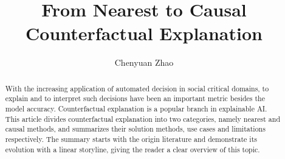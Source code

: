 \documentclass[runningheads]{llncs}
\begin{document}
%
\title{From Nearest to Causal Counterfactual Explanation}
%
%
\author{Chenyuan Zhao
}

%
\maketitle              %
%
\begin{abstract}
With the increasing application of automated decision in social critical domains, to explain and to interpret such decisions have been an important metric besides the model accuracy. Counterfactual explanation is a popular branch in explainable AI. This article divides counterfactual explanation into two categories, namely nearest and causal methods, and summarizes their solution methods, use cases and limitations respectively. The summary starts with the origin literature and demonstrate its evolution with a linear storyline, giving the reader a clear overview of this topic.


\end{abstract}
%

%


%





%
%
% 
% 
%

%
{}
\end{document}

